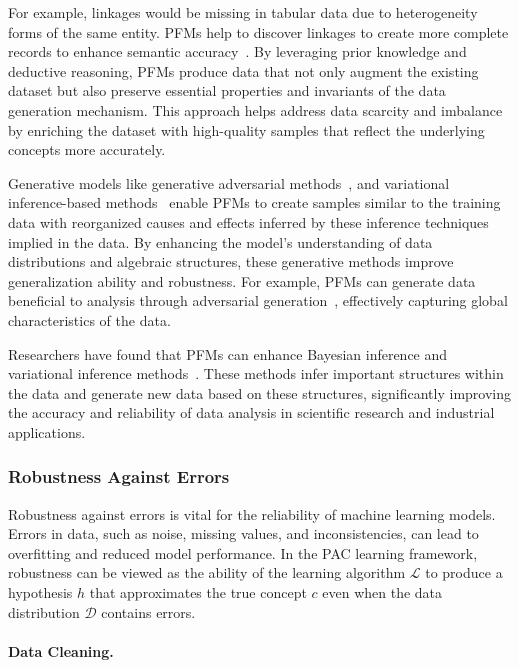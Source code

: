   
  For example, linkages would be missing in tabular data due to heterogeneity forms of the same entity. PFMs help to discover linkages to create more complete records to enhance semantic accuracy~\cite{Nobari2023DTTAE}. By leveraging prior knowledge and deductive reasoning, PFMs produce data that not only augment the existing dataset but also preserve essential properties and invariants of the data generation mechanism. This approach helps address data scarcity and imbalance by enriching the dataset with high-quality samples that reflect the underlying concepts more accurately.
  
  Generative models like generative adversarial methods~\cite{Loem2023SAIEFS}, and variational inference-based methods~\cite{huamortizing} enable PFMs to create samples similar to the training data with reorganized causes and effects inferred by these inference techniques implied in the data. By enhancing the model's understanding of data distributions and algebraic structures, these generative methods improve generalization ability and robustness. For example, PFMs can generate data beneficial to analysis through adversarial generation~\cite{du2024enhancing,weng2023g}, effectively capturing global characteristics of the data.
  
  Researchers have found that PFMs can enhance Bay\-esian inference and variational inference methods~\cite{huamortizing}. These methods infer important structures within the data and generate new data based on these structures, significantly improving the accuracy and reliability of data analysis in scientific research and industrial applications.
  
  \subsubsection{Robustness Against Errors}\label{sec:robustness}
  
  Robustness against errors is vital for the reliability of machine learning models. Errors in data, such as noise, missing values, and inconsistencies, can lead to overfitting and reduced model performance. In the PAC learning framework, robustness can be viewed as the ability of the learning algorithm $\mathcal{L}$ to produce a hypothesis $h$ that approximates the true concept $c$ even when the data distribution $\mathcal{D}$ contains errors.
  
  \paragraph{Data Cleaning.}
  
